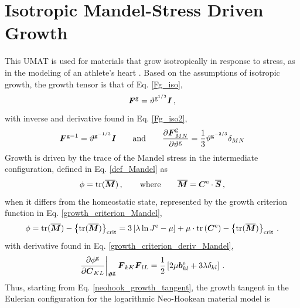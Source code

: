 \documentclass[10pt,letterpaper,oneside]{report}
\newcommand{\ten}[1]{\mbox{\boldmath $#1$}{}}
\newcommand{\scas}[1]{\mbox{{\scriptsize{${\rm{#1}}$}}}{}}
\newcommand{\tens}[1]{\mbox{\boldmath{\scriptsize{$#1$}}}{}}
\begin{document}
\section{Isotropic Mandel-Stress Driven Growth}

This UMAT is used for materials that grow isotropically in response to stress, as in the modeling of an athlete's heart \cite{Goktepe2010}.  Based on the assumptions of isotropic growth, the growth tensor is that of Eq. \ref{Fg_iso},
\begin{equation*}
\ten{F}^{\scas{g}} = \vartheta^{\scas{g}^{1/3}} \ten{I} \, , 
\end{equation*}
with inverse and derivative found in Eq. \ref{Fg_iso2},
\begin{equation*}
\ten{F}^{\scas{g}-1} = \vartheta^{\scas{g}^{-1/3}} \ten{I}
\qquad \mbox{and} \qquad
\frac{\partial \ten{F}^{\scas{g}}_{MN} }{\partial \vartheta^{\scas{g}}} = \frac{1}{3} \vartheta^{\scas{g}^{-2/3}} \delta_{MN}
\end{equation*}
Growth is driven by the trace of the Mandel stress in the intermediate configuration, defined in Eq. \ref{def_Mandel} as
\begin{equation}
\phi = \mbox{tr} ( \overline{\ten{M}} ) \, , 
\qquad \mbox{where} \qquad
\overline{\ten{M}} = \ten{C}^{\scas{e}} \cdot \overline{\ten{S}} \, ,
\end{equation}
when it differs from the homeostatic state, represented by the growth criterion function in Eq. \ref{growth_criterion_Mandel},
\begin{equation}
\phi = \mbox{tr} ( \overline{\ten{M}} ) - \left\lbrace \mbox{tr} ( \overline{\ten{M}} ) \right\rbrace_{\scas{crit}} 
= 3 \left[ \lambda \ln J^{\scas{e}} - \mu \right] + \mu \cdot \mbox{tr} \left( \ten{C}^{\scas{e}} \right)  - \left\lbrace \mbox{tr} ( \overline{\ten{M}} ) \right\rbrace_{\scas{crit}}\, . 
\end{equation}
with derivative found in Eq. \ref{growth_criterion_deriv_Mandel},
\begin{equation*}
\left. \frac{\partial \phi^{\scas{g}} }{\partial \ten{C}_{KL}} \right|_{\tens{\vartheta}^{\scas{g}}} \ten{F}_{kK} \ten{F}_{lL} 
= \frac{1}{2} \left[ 2 \mu \ten{b}^{\scas{e}}_{kl} + 3 \lambda \delta_{kl} \right] \, . 
\end{equation*}
Thus, starting from Eq. \ref{neohook_growth_tangent}, the growth tangent in the Eulerian configuration for the logarithmic Neo-Hookean material model is 
\end{document}
